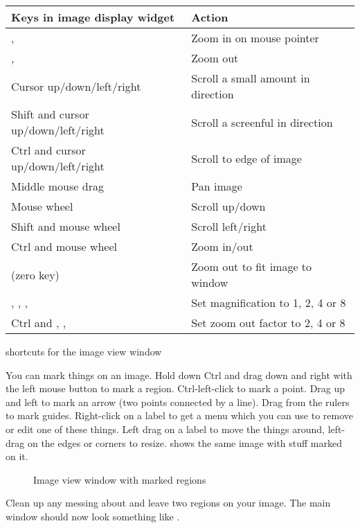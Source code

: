 \begin{tab2}
\begin{center}
\begin{tabular}{||l|l||}
\hline
Keys in image display widget  		& Action \\
\hline
\ct{i}, \ct{+} 				& Zoom in on mouse pointer \\
\ct{o}, \ct{-} 				& Zoom out \\
Cursor up/down/left/right 		& Scroll a small amount in direction \\
Shift and cursor up/down/left/right 	& Scroll a screenful in direction \\
Ctrl and cursor up/down/left/right 	& Scroll to edge of image \\
Middle mouse drag 			& Pan image \\
Mouse wheel 				& Scroll up/down \\
Shift and mouse wheel			& Scroll left/right \\
Ctrl and mouse wheel 			& Zoom in/out \\
\ct{0} (zero key) 			& Zoom out to fit image to window \\
\ct{1}, \ct{2}, \ct{4}, \ct{8}  	& Set magnification to 1, 2, 4 or 8 \\
Ctrl and \ct{2}, \ct{4}, \ct{8}		& Set zoom out factor to 2, 4 or 8 \\
\hline
\end{tabular}
\end{center}

\caption{\nip{} shortcuts for the image view window}
\end{tab2}

You can mark things on an image. Hold down Ctrl and drag down and right with
the left mouse button to mark a region. Ctrl-left-click to mark a point. Drag
up and left to mark an arrow (two points connected by a line). Drag from
the rulers to mark guides. Right-click on a label to get a menu which
you can use to remove or edit one of these things. Left drag on a label
to move the things around, left-drag on the edges or corners to resize.
 shows the same image with stuff marked on it.

\begin{figure}
\caption{Image view window with marked regions}
\end{figure}

Clean up any messing about and leave two regions on your image. The main
window should now look something like .

